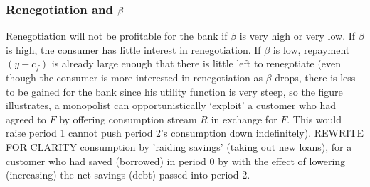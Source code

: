 \documentclass[11pt]{article}%
\providecommand{\DIFadd}[1]{{\protect\color{blue} \sf #1}} %
\providecommand{\DIFdel}[1]{{\protect\color{red} \scriptsize #1}} %
\providecommand{\DIFaddFL}[1]{\DIFadd{#1}} %
\providecommand{\DIFdelFL}[1]{\DIFdel{#1}} %
\providecommand{\DIFaddbeginFL}{} %
\providecommand{\DIFaddendFL}{} %
\providecommand{\DIFdelbeginFL}{} %
\providecommand{\DIFdelendFL}{} %
\begin{document}
\subsubsection{\DIFdelFL{Renegotiation and $\protect\beta $}}
\addtocounter{subsubsection}{-1}%

\DIFdelFL{Renegotiation will not be profitable for the bank if $\beta $ is very high
or very low. If $\beta $ is high, the consumer has little interest in
renegotiation. If $\beta $ is low, repayment $(y-\overline{c}_{f})$ is
already large enough that there is little left to renegotiate (even though
the consumer is more interested in renegotiation as $\beta $ drops, there is
less to be gained for the bank since his utility function is very steep, so
}\DIFdelendFL \DIFaddbeginFL \DIFaddFL{the figure illustrates, a monopolist can opportunistically `exploit' a customer who had agreed to $F$ by offering consumption stream $R$ in exchange for $F$\( \). This would raise }\DIFaddendFL period 1 \DIFdelbeginFL \DIFdelFL{cannot push period 2's consumption down indefinitely).}%
\DIFdelFL{REWRITE FOR
CLARITY}%
\DIFdelendFL \DIFaddbeginFL \DIFaddFL{consumption by 'raiding savings' (taking out new loans), for a customer who had saved (borrowed) in period 0 by with the effect of lowering (increasing) the net savings (debt) passed into period 2.
}\DIFaddendFL 
\end{document}
